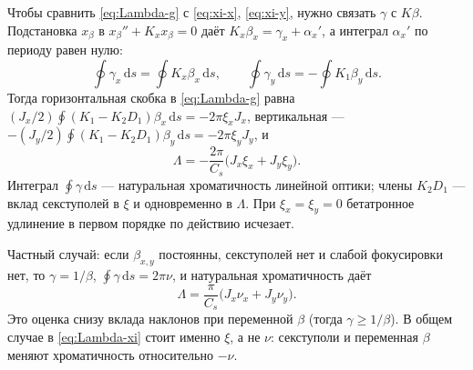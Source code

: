 Чтобы сравнить \eqref{eq:Lambda-g} с \eqref{eq:xi-x}, \eqref{eq:xi-y}, нужно связать $\gamma$ с $K\beta$. Подстановка $x_\beta$ в $x_\beta''+K_x x_\beta=0$ даёт $K_x\beta_x=\gamma_x+\alpha_x'$, а интеграл $\alpha_x'$ по периоду равен нулю:
\begin{equation}
\label{eq:gamma-K}
\oint\gamma_x\,\mathrm{d}s=\oint K_x\beta_x\,\mathrm{d}s,
\qquad
\oint\gamma_y\,\mathrm{d}s=-\oint K_1\beta_y\,\mathrm{d}s.
\end{equation}
Тогда горизонтальная скобка в \eqref{eq:Lambda-g} равна $(J_x/2)\oint(K_1-K_2D_1)\beta_x\,\mathrm{d}s=-2\pi\xi_xJ_x$, вертикальная --- $-(J_y/2)\oint(K_1-K_2D_1)\beta_y\,\mathrm{d}s=-2\pi\xi_yJ_y$, и
\begin{equation}
\label{eq:Lambda-xi}
\Lambda
=-\frac{2\pi}{C_s}\bigl(J_x\xi_x+J_y\xi_y\bigr).
\end{equation}
Интеграл $\oint\gamma\,\mathrm{d}s$ --- натуральная хроматичность линейной оптики; члены $K_2D_1$ --- вклад секступолей в $\xi$ и одновременно в $\Lambda$. При $\xi_x=\xi_y=0$ бетатронное удлинение в первом порядке по действию исчезает.

Частный случай: если $\beta_{x,y}$ постоянны, секступолей нет и слабой фокусировки нет, то $\gamma=1/\beta$, $\oint\gamma\,\mathrm{d}s=2\pi\nu$, и натуральная хроматичность даёт
\begin{equation}
\label{eq:Lambda-nu}
\Lambda
=\frac{\pi}{C_s}\bigl(J_x\nu_x+J_y\nu_y\bigr).
\end{equation}
Это оценка снизу вклада наклонов при переменной $\beta$ (тогда $\gamma\ge 1/\beta$). В общем случае в \eqref{eq:Lambda-xi} стоит именно $\xi$, а не $\nu$: секступоли и переменная $\beta$ меняют хроматичность относительно $-\nu$.

